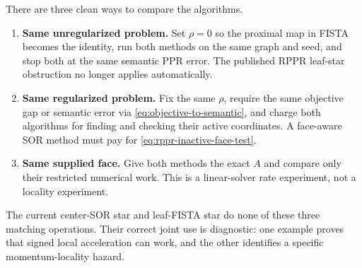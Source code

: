 There are three clean ways to compare the algorithms.

\begin{enumerate}[leftmargin=*]
\item \textbf{Same unregularized problem.}  Set $\rho=0$ so the proximal map
      in FISTA becomes the identity, run both methods on the same graph and
      seed, and stop both at the same semantic PPR error.  The published RPPR
      leaf-star obstruction no longer applies automatically.
\item \textbf{Same regularized problem.}  Fix the same $\rho$, require the
      same objective gap or semantic error via
      \eqref{eq:objective-to-semantic}, and charge both algorithms for finding
      and checking their active coordinates.  A face-aware SOR method must pay
      for \eqref{eq:rppr-inactive-face-test}.
\item \textbf{Same supplied face.}  Give both methods the exact $A$ and
      compare only their restricted numerical work.  This is a linear-solver
      rate experiment, not a locality experiment.
\end{enumerate}

The current center-SOR star and leaf-FISTA star do none of these three
matching operations.  Their correct joint use is diagnostic: one example
proves that signed local acceleration can work, and the other identifies a
specific momentum-locality hazard.
